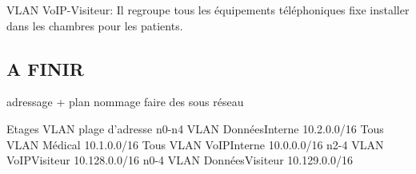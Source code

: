 VLAN VoIP-Visiteur:
Il regroupe  tous les équipements téléphoniques fixe installer dans les chambres pour les patients.



%
%
\subsection{A FINIR}

adressage + plan nommage
faire des sous réseau

Etages
VLAN
plage d’adresse
n0-n4
VLAN DonnéesInterne
10.2.0.0/16
Tous
VLAN Médical
10.1.0.0/16
Tous
VLAN VoIPInterne
10.0.0.0/16
n2-4
VLAN
VoIPVisiteur
10.128.0.0/16
n0-4
VLAN DonnéesVisiteur
10.129.0.0/16


%
%
